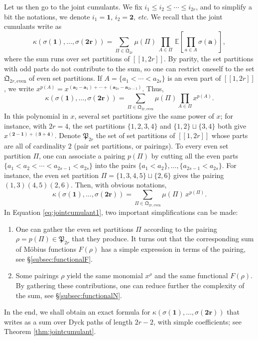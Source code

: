\documentclass[12pt,a4paper,reqno]{amsart}
\newcommand{\esper}{\mathbb{E}}
\newcommand{\pym}{\mathfrak{P}}
\newcommand{\qym}{\mathfrak{Q}}
\newcommand{\lle}{\left[\!\left[}
\newcommand{\rre}{\right]\!\right]}
\theoremstyle{remark}
\begin{document}
Let us then go to the joint cumulants. We fix $i_1 \leq i_2 \leq \cdots \leq i_{2r}$, and to simplify a bit the notations, we denote $i_1=\mathbf{1}$, $i_2=\mathbf{2}$, \emph{etc}. We recall that the joint cumulants write as
$$\kappa(\sigma(\mathbf{1}),\ldots,\sigma(\mathbf{2r}))=\sum_{\Pi \in \qym_{2r}}\mu(\Pi)\,\prod_{A \in \Pi}\,\esper\!\left[\prod_{a \in A} \sigma(\mathbf{a})\right],$$
where the sum runs over set partitions of $\lle 1,2r\rre$. By parity, the set partitions with odd parts do not contribute to the sum, so one can restrict oneself to the set $\qym_{2r,\text{even}}$ of even set partitions. If $A=\{a_1<\cdots<a_{2s}\}$ is an even part of $\lle 1,2r\rre$, we write $x^{p(A)}=x^{(\mathbf{a}_{2}-\mathbf{a}_{1})+\cdots+(\mathbf{a}_{2s}-\mathbf{a}_{2s-1})}$. Thus,
$$\kappa(\sigma(\mathbf{1}),\ldots,\sigma(\mathbf{2r}))=\sum_{\Pi \in \qym_{2r,\text{even}}}\mu(\Pi)\prod_{A \in \Pi} x^{p(A)}.$$
In this polynomial in $x$, several set partitions give the same power of $x$; for instance, with $2r=4$, the set partitions $\{1,2,3,4\}$ and $\{1,2\} \sqcup \{3,4\}$ both give $x^{(\mathbf{2}-\mathbf{1})+(\mathbf{3}+\mathbf{4})}$. Denote $\pym_{2r}$ the set of set partitions of $\lle 1,2r\rre$ whose parts are all of cardinality $2$ (pair set partitions, or pairings). To every even set partition $\Pi$, one can associate a pairing $p(\Pi)$ by cutting all the even parts $\{a_1<a_2<\cdots<a_{2s-1}<a_{2s}\}$ into the pairs $\{a_1<a_2\},\ldots,\{a_{2s-1}<a_{2s}\}$. For instance, the even set partition $\Pi=\{1,3,4,5\}\sqcup\{2,6\}$ gives the pairing $(1,3)(4,5)(2,6)$. Then, with obvious notations,
\begin{equation}\kappa(\sigma(\mathbf{1}),\ldots,\sigma(\mathbf{2r}))=\sum_{\Pi \in \qym_{2r,\text{even}}}\mu(\Pi)\, x^{p(\Pi)}.
\label{eq:jointcumulant1}
\end{equation}
In Equation \eqref{eq:jointcumulant1}, two important simplifications can be made:\vspace{2mm}
\begin{enumerate}
\item One can gather the even set partitions $\Pi$ according to the pairing $\rho=p(\Pi) \in \pym_{2r}$ that they produce. It turns out that the corresponding sum of M\"obius functions $F(\rho)$ has a simple expression in terms of the pairing, see \S\ref{subsec:functionalF}.  \vspace{1mm}
\item Some pairings $\rho$ yield the same monomial $x^{\rho}$ and the same functional $F(\rho)$. By gathering these contributions, one can reduce further the complexity of the sum, see \S\ref{subsec:functionalN}.\vspace{1mm}
\end{enumerate}
In the end, we shall obtain an exact formula for $\kappa(\sigma(\mathbf{1}),\ldots,\sigma(\mathbf{2r}))$ that writes as a sum over Dyck paths of length $2r-2$, with simple coefficients; see Theorem \ref{thm:jointcumulant}.
\end{document}
